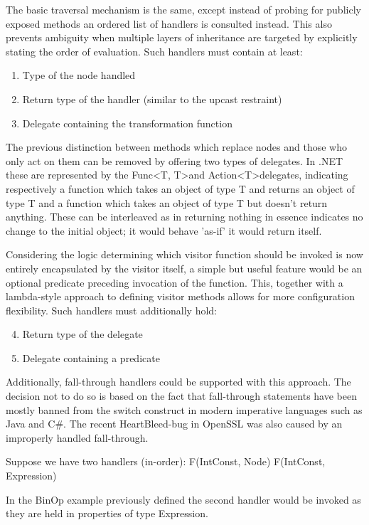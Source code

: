\documentclass[final,a4paper,12pt]{article}
\begin{document}
The basic traversal mechanism is the same, except instead of probing for publicly exposed methods an ordered list of handlers is consulted instead. This also prevents ambiguity when multiple layers of inheritance are targeted by explicitly stating the order of evaluation. Such handlers must contain at least:
\begin{enumerate}
	\item Type of the node handled
	\item Return type of the handler (similar to the upcast restraint)
	\item Delegate containing the transformation function
\end{enumerate}

The previous distinction between methods which replace nodes and those who only act on them can be removed by offering two types of delegates. In .NET these are represented by the Func\textless T, T\textgreater and Action\textless T\textgreater  delegates, indicating respectively a function which takes an object of type T and returns an object of type T and a function which takes an object of type T but doesn't return anything. These can be interleaved as in returning nothing in essence indicates no change to the initial object; it would behave 'as-if' it would return itself.

Considering the logic determining which visitor function should be invoked is now entirely encapsulated by the visitor itself, a simple but useful feature would be an optional predicate preceding invocation of the function. This, together with a lambda-style approach to defining visitor methods allows for more configuration flexibility. Such handlers must additionally hold:
\begin{enumerate}
	\setcounter{enumi}{3}
	\item Return type of the delegate
	\item Delegate containing a predicate
\end{enumerate}

Additionally, fall-through handlers could be supported with this approach. The decision not to do so is based on the fact that fall-through statements have been mostly banned from the switch construct in modern imperative languages such as Java and C\#. The recent HeartBleed-bug in OpenSSL was also caused by an improperly handled fall-through.

Suppose we have two handlers (in-order):
	F(IntConst, Node)
	F(IntConst, Expression)

In the BinOp example previously defined the second handler would be invoked as they are held in properties of type Expression. 
\end{document}
